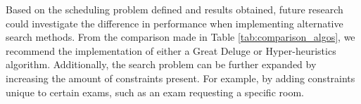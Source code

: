 Based on the scheduling problem defined and results obtained, future research could investigate the difference in performance when implementing alternative search methods. From the comparison made in Table \ref{tab:comparison_algos}, we recommend the implementation of either a Great Deluge or Hyper-heuristics algorithm. Additionally, the search problem can be further expanded by increasing the amount of constraints present. For example, by adding constraints unique to certain exams, such as an exam requesting a specific room.





